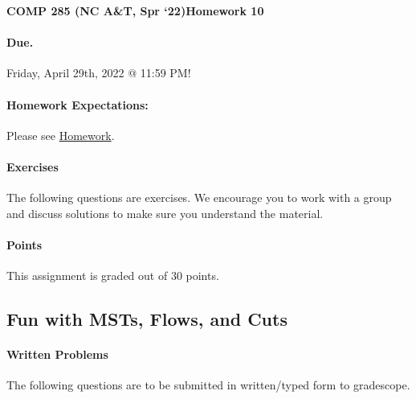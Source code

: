 \documentclass [12pt]{article}
\begin{document}
 

{\LARGE \textbf{COMP 285 (NC A\&T, Spr `22)}\hfill \textbf{Homework 10} } 
\vspace{1em} 
\begin{Instruction} 

\paragraph{Due.} Friday, April 29th, 2022 @ 11:59 PM!
\end{Instruction}

\vspace{1em} 
\begin{Instruction} \paragraph{Homework Expectations:} Please see \href{https://www.comp285.ml/homework/#general-homework-information}{Homework}.
\end{Instruction}

\vspace{1em} 
\begin{Instruction} 

\paragraph{Exercises} The following questions are exercises. We encourage you to work with a group and discuss solutions to make sure you understand the material.

\paragraph{Points} This assignment is graded out of 30 points.

\end{Instruction} 

\begin{centering}
\section*{Fun with MSTs, Flows, and Cuts}
\end{centering}

\begin{Instruction}

\paragraph{Written Problems} The following questions are to be submitted in written/typed form to gradescope.

\end{Instruction}
\end{document}
